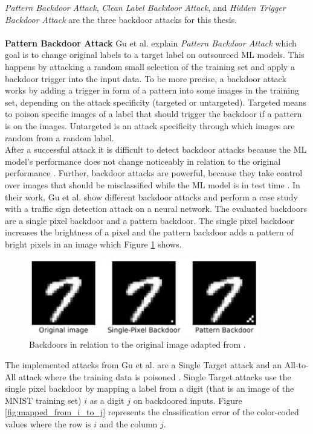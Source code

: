 \textit{Pattern Backdoor Attack}, \textit{Clean Label Backdoor Attack}, and \textit{Hidden Trigger Backdoor Attack} are the three backdoor attacks for this thesis. \\ \\
\textbf{Pattern Backdoor Attack} Gu et al. \cite{DBLP:journals/corr/abs-1708-06733} explain \textit{Pattern Backdoor Attack} which goal is to change original labels to a target label on outsourced ML models. This happens by attacking a random small selection of the training set and apply a backdoor trigger into the input data. To be more precise, a backdoor attack works by adding a trigger in form of a pattern into some images in the training set, depending on the attack specificity (targeted or untargeted). Targeted means to poison specific images of a label that should trigger the backdoor if a pattern is on the images. Untargeted is an attack specificity through which images are random from a random label. \\ After a successful attack it is difficult to detect backdoor attacks because the ML model's performance does not change noticeably in relation to the original performance \cite{DBLP:journals/corr/abs-2106-07925}. Further, backdoor attacks are powerful, because they take control over images that should be misclassified while the ML model is in test time \cite{turner2018clean}. In their work, Gu et al. show different backdoor attacks and perform a case study with a traffic sign detection attack on a neural network. The evaluated backdoors are a single pixel backdoor and a pattern backdoor. The single pixel backdoor increases the brightness of a pixel and the pattern backdoor adds a pattern of bright pixels in an image which Figure \ref{fig:backdoor_pattern} shows.

\begin{figure}[ht!]
  \centering
  \includegraphics[width=10cm]{pictures/backdoor_pattern_bad_net.jpg}
  \caption{Backdoors in relation to the original image adapted from \cite{DBLP:journals/corr/abs-1708-06733}.}
  \label{fig:backdoor_pattern}
\end{figure}

The implemented attacks from Gu et al. are a Single Target attack and an All-to-All attack where the training data is poisoned \cite{DBLP:conf/ccs/HuangJNRT11}. Single Target attacks use the single pixel backdoor by mapping a label from a digit (that is an image of the MNIST \cite{LeCun1995LearningAF} training set) $i$ as a digit $j$ on backdoored inputs. Figure \ref{fig:mapped_from_i_to_j} represents the classification error of the color-coded values where the row is $i$ and the column $j$.

